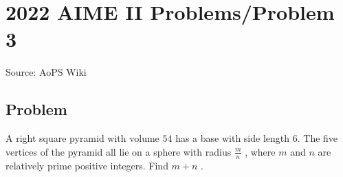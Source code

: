 \documentclass[12pt]{article}
\begin{document}
\section*{{2022 AIME II Problems/Problem 3}}
Source: AoPS Wiki

\subsection*{Problem}
A right square pyramid with volume $54$ has a base with side length $6.$ The five vertices of the pyramid all lie on a sphere with radius $\frac mn$ , where $m$ and $n$ are relatively prime positive integers. Find $m+n$ .
\end{document}
